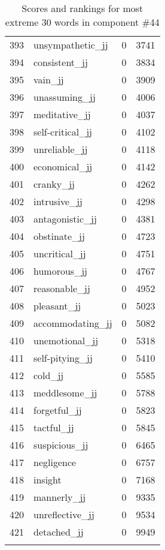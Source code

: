\begin{longtable}[!htbp]{| rlr@{.}l |}
    393 & unsympathetic\_jj & 0 & 3741 \\
    394 & consistent\_jj & 0 & 3834 \\
    395 & vain\_jj & 0 & 3909 \\
    396 & unassuming\_jj & 0 & 4006 \\
    397 & meditative\_jj & 0 & 4037 \\
    398 & self-critical\_jj & 0 & 4102 \\
    399 & unreliable\_jj & 0 & 4118 \\
    400 & economical\_jj & 0 & 4142 \\
    401 & cranky\_jj & 0 & 4262 \\
    402 & intrusive\_jj & 0 & 4298 \\
    403 & antagonistic\_jj & 0 & 4381 \\
    404 & obstinate\_jj & 0 & 4723 \\
    405 & uncritical\_jj & 0 & 4751 \\
    406 & humorous\_jj & 0 & 4767 \\
    407 & reasonable\_jj & 0 & 4952 \\
    408 & pleasant\_jj & 0 & 5023 \\
    409 & accommodating\_jj & 0 & 5082 \\
    410 & unemotional\_jj & 0 & 5318 \\
    411 & self-pitying\_jj & 0 & 5410 \\
    412 & cold\_jj & 0 & 5585 \\
    413 & meddlesome\_jj & 0 & 5788 \\
    414 & forgetful\_jj & 0 & 5823 \\
    415 & tactful\_jj & 0 & 5845 \\
    416 & suspicious\_jj & 0 & 6465 \\
    417 & negligence & 0 & 6757 \\
    418 & insight & 0 & 7168 \\
    419 & mannerly\_jj & 0 & 9335 \\
    420 & unreflective\_jj & 0 & 9534 \\
    421 & detached\_jj & 0 & 9949 \\
    \hline
    \caption{Scores and rankings for most extreme 30 words in component \#44} \\
\end{longtable}
